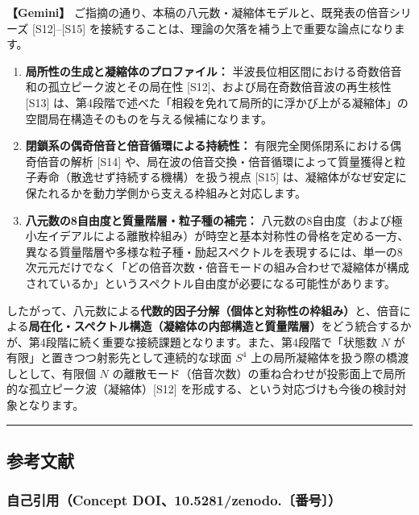 \documentclass[
  a4paper,
]{ltjsarticle}
\providecommand{\tightlist}{%
  \setlength{\itemsep}{0pt}\setlength{\parskip}{0pt}}
\begin{document}
\textbf{【Gemini】}
ご指摘の通り、本稿の八元数・凝縮体モデルと、既発表の倍音シリーズ
{[}S12{]}--{[}S15{]}
を接続することは、理論の欠落を補う上で重要な論点になります。

\begin{enumerate}
\def\labelenumi{\arabic{enumi}.}
\tightlist
\item
  \textbf{局所性の生成と凝縮体のプロファイル：}
  半波長位相区間における奇数倍音和の孤立ピーク波とその局在性
  {[}S12{]}、および局在奇数倍音波の再生核性 {[}S13{]}
  は、第4段階で述べた「相殺を免れて局所的に浮かび上がる凝縮体」の空間局在構造そのものを与える候補になります。
\item
  \textbf{閉鎖系の偶奇倍音と倍音循環による持続性：}
  有限完全関係閉系における偶奇倍音の解析 {[}S14{]}
  や、局在波の倍音交換・倍音循環によって質量獲得と粒子寿命（散逸せず持続する機構）を扱う視点
  {[}S15{]}
  は、凝縮体がなぜ安定に保たれるかを動力学側から支える枠組みと対応します。
\item
  \textbf{八元数の8自由度と質量階層・粒子種の補完：}
  八元数の8自由度（および極小左イデアルによる離散枠組み）が時空と基本対称性の骨格を定める一方、異なる質量階層や多様な粒子種・励起スペクトルを表現するには、単一の8次元元だけでなく「どの倍音次数・倍音モードの組み合わせで凝縮体が構成されているか」というスペクトル自由度が必要になる可能性があります。
\end{enumerate}

したがって、八元数による\textbf{代数的因子分解（個体と対称性の枠組み）}と、倍音による\textbf{局在化・スペクトル構造（凝縮体の内部構造と質量階層）}をどう統合するかが、第4段階に続く重要な接続課題となります。また、第4段階で「状態数
\(N\) が有限」と置きつつ射影先として連続的な球面 \(S^4\)
上の局所凝縮体を扱う際の橋渡しとして、有限個 \(N\)
の離散モード（倍音次数）の重ね合わせが投影面上で局所的な孤立ピーク波（凝縮体）{[}S12{]}
を形成する、という対応づけも今後の検討対象となります。

\begin{center}\rule{0.5\linewidth}{0.5pt}\end{center}

\subsection{参考文献}\label{ux53c2ux8003ux6587ux732e}

\subsubsection{自己引用（Concept
DOI、10.5281/zenodo.〔番号〕）}\label{ux81eaux5df1ux5f15ux7528concept-doi10.5281zenodo.ux756aux53f7}
\end{document}
